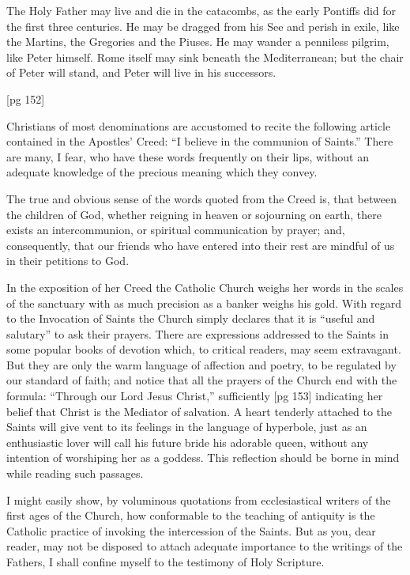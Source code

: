 The Holy Father may live and die in the catacombs,
as the early Pontiffs did for the first three
centuries. He may be dragged from his See and
perish in exile, like the Martins, the Gregories and
the Piuses. He may wander a penniless pilgrim,
like Peter himself. Rome itself may sink beneath
the Mediterranean; but the chair of Peter will
stand, and Peter will live in his successors.

[pg 152]


Christians of most denominations are accustomed
to recite the following article contained
in the Apostles' Creed: “I believe in
the communion of Saints.” There are many, I
fear, who have these words frequently on their
lips, without an adequate knowledge of the precious
meaning which they convey.

The true and obvious sense of the words quoted
from the Creed is, that between the children of
God, whether reigning in heaven or sojourning on
earth, there exists an intercommunion, or spiritual
communication by prayer; and, consequently, that
our friends who have entered into their rest are
mindful of us in their petitions to God.

In the exposition of her Creed the Catholic
Church weighs her words in the scales of the
sanctuary with as much precision as a banker
weighs his gold. With regard to the Invocation of
Saints the Church simply declares that it is “useful
and salutary” to ask their prayers. There
are expressions addressed to the Saints in some
popular books of devotion which, to critical readers,
may seem extravagant. But they are only
the warm language of affection and poetry, to be
regulated by our standard of faith; and notice that
all the prayers of the Church end with the
formula: “Through our Lord Jesus Christ,” sufficiently
[pg 153]
indicating her belief that Christ is the
Mediator of salvation. A heart tenderly attached
to the Saints will give vent to its feelings in the
language of hyperbole, just as an enthusiastic
lover will call his future bride his adorable queen,
without any intention of worshiping her as a goddess.
This reflection should be borne in mind
while reading such passages.

I might easily show, by voluminous quotations
from ecclesiastical writers of the first ages of the
Church, how conformable to the teaching of antiquity
is the Catholic practice of invoking the
intercession of the Saints. But as you, dear
reader, may not be disposed to attach adequate
importance to the writings of the Fathers, I shall
confine myself to the testimony of Holy Scripture.

